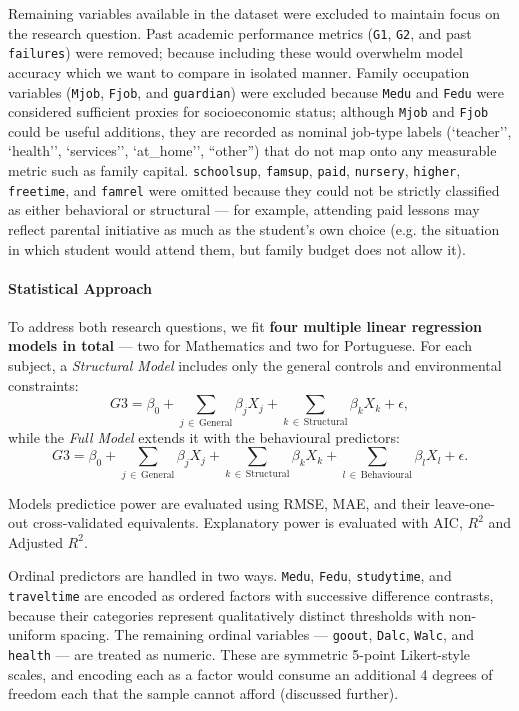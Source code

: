 \documentclass{article}
\begin{document}
Remaining variables available in the dataset were excluded to maintain focus on the research question. Past academic performance metrics (\texttt{G1}, \texttt{G2}, and past \texttt{failures}) were removed; because including these would overwhelm model accuracy which we want to compare in isolated manner. Family occupation variables (\texttt{Mjob}, \texttt{Fjob}, and \texttt{guardian}) were excluded because \texttt{Medu} and \texttt{Fedu} were considered sufficient proxies for socioeconomic status; although \texttt{Mjob} and \texttt{Fjob} could be useful additions, they are recorded as nominal job-type labels (`teacher'', `health'', `services'', `at\_home'', ``other'') that do not map onto any measurable metric such as family capital. \texttt{schoolsup}, \texttt{famsup}, \texttt{paid}, \texttt{nursery}, \texttt{higher}, \texttt{freetime}, and \texttt{famrel} were omitted because they could not be strictly classified as either behavioral or structural --- for example, attending paid lessons may reflect parental initiative as much as the student's own choice (e.g. the situation in which student would attend them, but family budget does not allow it).


\paragraph{Statistical Approach}

To address both research questions, we fit \textbf{four multiple linear regression models in total} --- two for Mathematics and two for Portuguese. For each subject, a \textit{Structural Model} includes only the general controls and environmental constraints:
\[
  G3 = \beta_0
       + \sum_{j\,\in\,\text{General}} \beta_j X_j
       + \sum_{k\,\in\,\text{Structural}} \beta_k X_k
       + \epsilon,
\]
while the \textit{Full Model} extends it with the behavioural predictors:
\[
  G3 = \beta_0
       + \sum_{j\,\in\,\text{General}} \beta_j X_j
       + \sum_{k\,\in\,\text{Structural}} \beta_k X_k
       + \sum_{l\,\in\,\text{Behavioural}} \beta_l X_l
       + \epsilon.
\]

Models predictice power are evaluated using RMSE, MAE, and their leave-one-out cross-validated equivalents. Explanatory power is evaluated with AIC, $R^2$ and Adjusted $R^2$.

\vspace{0.5em}
Ordinal predictors are handled in two ways. \texttt{Medu}, \texttt{Fedu}, \texttt{studytime}, and \texttt{traveltime} are encoded as ordered factors with successive difference contrasts, because their categories represent qualitatively distinct thresholds with non-uniform spacing. The remaining ordinal variables --- \texttt{goout}, \texttt{Dalc}, \texttt{Walc}, and \texttt{health} --- are treated as numeric. These are symmetric 5-point Likert-style scales, and encoding each as a factor would consume an additional 4 degrees of freedom each that the sample cannot afford (discussed further).
\end{document}
